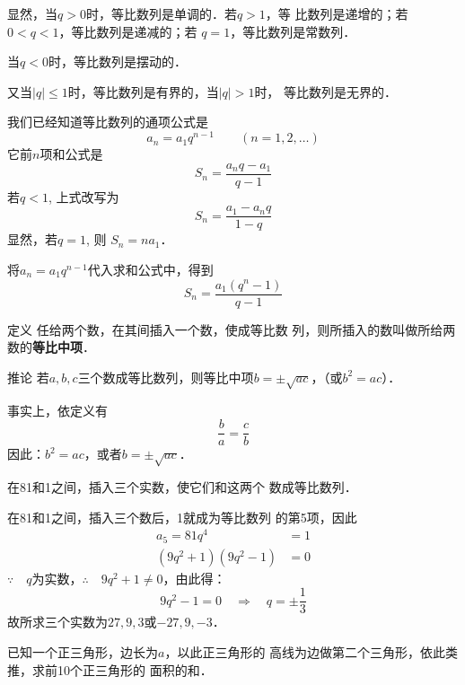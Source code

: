显然，当$q>0$时，等比数列是单调的．若$q>1$，等
比数列是递增的；若$0<q<1$，等比数列是递减的；若
$q=1$，等比数列是常数列．

当$q<0$时，等比数列是摆动的．

又当$|q|\le 1$时，等比数列是有界的，当$|q|>1$时，
等比数列是无界的．

我们已经知道等比数列的通项公式是
\[a_n=a_1q^{n-1}\qquad (n=1,2,\ldots)\]
它前$n$项和公式是
\[S_n=\frac{a_nq-a_1}{q-1}\]
若$q<1$, 上式改写为
\[S_n=\frac{a_1-a_nq}{1-q}\]
显然，若$q=1$, 则 $S_n=na_1$．

将$a_n=a_1q^{n-1}$代入求和公式中，得到
\[S_n=\frac{a_1(q^n-1)}{q-1}\]

\begin{blk}{定义}
    任给两个数，在其间插入一个数，使成等比数
列，则所插入的数叫做所给两数的\textbf{等比中项}．
\end{blk}

\begin{blk}{推论}
    若$a,b,c$三个数成等比数列，则等比中项$b=\pm\sqrt{ac}$，（或$b^2=ac$）．    
\end{blk}

事实上，依定义有$$\frac{b}{a}=\frac{c}{b}$$
因此：$b^2=ac$，或者$b=\pm\sqrt{ac}$．

\begin{example}
    在81和1之间，插入三个实数，使它们和这两个
数成等比数列．
\end{example}

\begin{solution}
    在81和1之间，插入三个数后，1就成为等比数列
的第5项，因此
\[\begin{split}
  a_5=81q^4&=1\\
  (9q^2+1)(9q^2-1)&=0  
\end{split}\]
$\because\quad q$为实数，$\therefore\quad 9q^2+1\ne 0$，由此得：
\[9q^2-1=0\quad \Rightarrow\quad q=\pm\frac{1}{3}\]
故所求三个实数为$27,9,3$或$-27,9,-3$．
\end{solution}


\begin{example}
    已知一个正三角形，边长为$a$，以此正三角形的
高线为边做第二个三角形，依此类推，求前10个正三角形的
面积的和．
\end{example}

\begin{figure}[htp]
    \centering
{}
    \caption{}
\end{figure}



